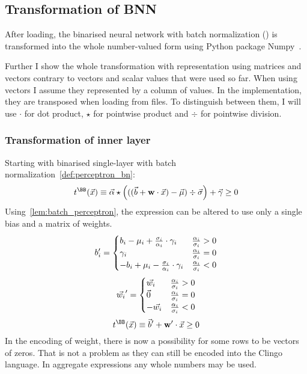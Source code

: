 \subsection{Transformation of BNN}

After loading, the binarised neural network with batch normalization
() is transformed into the whole number-valued
form using Python package Numpy~\cite{harris2020array}.

Further I show the whole transformation with representation using matrices and vectors
contrary to vectors and scalar values that were used so far.
When using vectors I assume they represented by a column of values.
In the implementation, they are transposed when loading from files.
To distinguish between them, I will use $\cdot$ for dot product,
$\star$ for pointwise product and $\div$ for pointwise division.

\subsubsection{Transformation of inner layer}

Starting with binarised single-layer with batch normalization~\cref{def:perceptron_bn}:
\[t^{\BB}(\vec x) \equiv \vec\alpha \star \left({((\vec b + \mathbf{w} \cdot \vec x) - \vec\mu) \div \vec\sigma}\right) + \vec\gamma \geq 0\]
Using~\cref{lem:batch_perceptron}, the expression can be altered to use only a single
bias and a matrix of weights.
\[b_i' = \begin{cases}
	b_i - \mu_i + {\sigma_i\over \alpha_i}\cdot \gamma_i & {\alpha_i \over \sigma_i} > 0\\
	\gamma_i & {\alpha_i\over \sigma_i} = 0\\
	-b_i + \mu_i - {\sigma_i\over \alpha_i}\cdot \gamma_i & {\alpha_i \over \sigma_i} < 0\\
\end{cases}\]
\[\vec{w_i}' = \begin{cases}
	\vec{w_i} & {\alpha_i \over \sigma_i} > 0\\
	\vec{0} & {\alpha_i\over \sigma_i} = 0\\
	-\vec{w_i} & {\alpha_i \over \sigma_i} < 0\\
\end{cases}\]
\[t^\BB(\vec x) \equiv \vec b' + \mathbf{w}'\cdot \vec x \geq 0\]
In the encoding of weight, there is now a possibility for some rows to be vectors of zeros.
That is not a problem as they can still be encoded into the Clingo language.
In aggregate expressions any whole numbers may be used.

